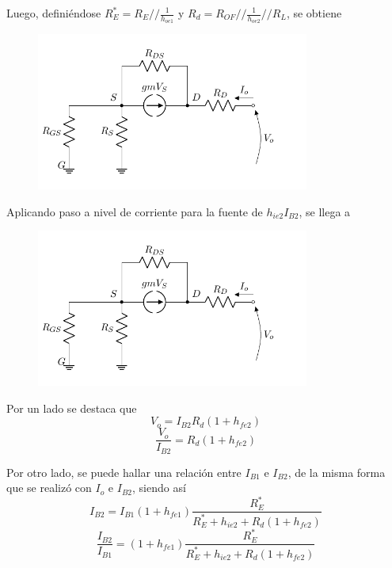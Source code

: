 Luego, definiéndose $R_{E}^* = R_{E} // \frac{1}{h_{oe1}}$ y $R_d = R_{OF} // \frac{1}{h_{oe2}} // R_L$, se obtiene
\begin{figure}[H]
\centering
	\includegraphics[width=0.8\textwidth, page=4]{Imagenes/ModeloIncremental.pdf}
\end{figure}

Aplicando paso a nivel de corriente para la fuente de $h_{ie2} I_{B2}$, se llega a
\begin{figure}[H]
\centering
	\includegraphics[width=0.8\textwidth, page=5]{Imagenes/ModeloIncremental.pdf}
\end{figure}

Por un lado se destaca que 
\begin{equation*}
	V_o = I_{B2} R_d \left( 1 + h_{fe2} \right)
\end{equation*}
\begin{equation}
	\frac{V_o}{I_{B2}} = R_d \left( 1 + h_{fe2} \right)
\label{equ:vo-ib2}
\end{equation}

Por otro lado, se puede hallar una relación entre $I_{B1}$ e $I_{B2}$, de la misma forma que se realizó con $I_o$ e $I_{B2}$, siendo así
\begin{equation*}
	I_{B2} = I_{B1} \left( 1 + h_{fe1} \right) \frac{R_{E}^*}{ R_{E}^* + h_{ie2} + R_d \left( 1 + h_{fe2} \right) }
\end{equation*}
\begin{equation}
	\frac{I_{B2}}{I_{B1}} = \left( 1 + h_{fe1} \right) \frac{R_{E}^*}{ R_{E}^* + h_{ie2} + R_d \left( 1 + h_{fe2} \right) }
	\label{equ:ib2-ib1}
\end{equation}

